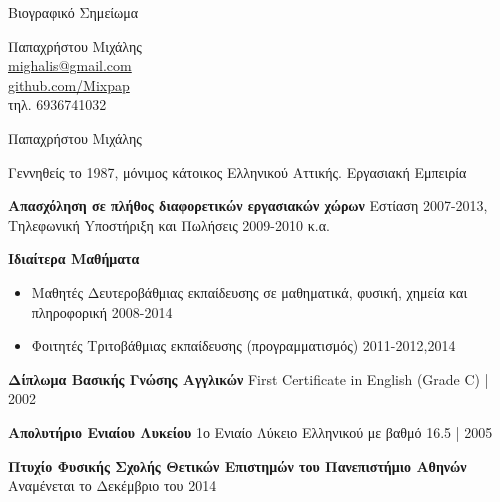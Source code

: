 \documentclass[a4paper,12pt,final]{memoir}
\newcommand{\SmallSep}{\vspace{0.25em}}
\newenvironment{AboutMe}
	{\ignorespaces\textbf{\color{RoyalBlue} \textbullet{}}}
\newcommand{\CVSection}[1]
	{\Large{#1}\par
	\SmallSep\normalsize\normalfont}
\newcommand{\CVItem}[2]
	{\textbf{\color{RoyalBlue} #1} #2}
\newcommand{\location}[1]{ %
\small{\color{headings}#1}}
\newenvironment{tightitemize} %
{\vspace{-\topsep}\begin{itemize}\itemsep1pt \parskip0pt \parsep0pt}
{\end{itemize}\vspace{-\topsep}}
\begin{document}
\begin{flushright}
Βιογραφικό Σημείωμα
\vspace{0.75cm}

\small
	Παπαχρήστου Μιχάλης \\
	\url{mighalis@gmail.com}  \\
	\url{github.com/Mixpap} \\
	τηλ. 6936741032
\end{flushright}\normalsize
\framebreak


\Huge {\color{RoyalBlue} Παπαχρήστου Μιχάλης} \\

\normalsize\normalfont

\begin{AboutMe}
Γεννηθείς το 1987, μόνιμος κάτοικος Ελληνικού Αττικής.
\end{AboutMe}

\CVSection{Εργασιακή Εμπειρία}

\SmallSep

\CVItem{Aπασχόληση σε πλήθος διαφορετικών εργασιακών χώρων}{\newline}
\location{Eστίαση 2007-2013, Tηλεφωνική Yποστήριξη και Πωλήσεις 2009-2010 κ.α.}


\CVItem{Ιδιαίτερα Μαθήματα}{}
\begin{tightitemize}
	\item Μαθητές Δευτεροβάθμιας εκπαίδευσης σε μαθηματικά, φυσική, χημεία και πληροφορική \location{2008-2014}
	\item Φοιτητές Τριτοβάθμιας εκπαίδευσης (προγραμματισμός)
	\location{2011-2012,2014}
\end{tightitemize}
\SmallSep

\CVItem{Δίπλωμα Βασικής Γνώσης Αγγλικών}{\newline}
\location{First Certificate in English (Grade C) | 2002}
\SmallSep

\CVItem{Απολυτήριο Ενιαίου Λυκείου}{\newline}
\location{1ο Ενιαίο Λύκειο Ελληνικού με βαθμό 16.5 | 2005}
\SmallSep

\CVItem{Πτυχίο Φυσικής Σχολής Θετικών Επιστημών του Πανεπιστήμιο Αθηνών}{\newline}
\location{Αναμένεται το Δεκέμβριο του 2014}
\SmallSep
\end{document}
